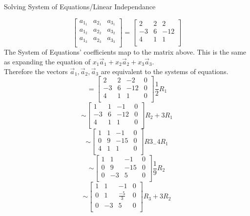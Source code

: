 \documentclass[12pt]{article}
\newcommand{\sqbrl}{\left[}
\newcommand{\sqbrr}{\right]}
\newenvironment{problem}[2][Problem]{\begin{trivlist}
\item[\hskip \labelsep {\bfseries #1}\hskip \labelsep {\bfseries #2.}]}{\end{trivlist}}
\begin{document}
\begin{problem}{5}
	Solving System of Equations/Linear Independance
\end{problem}
	\[\sqbrl\begin{matrix}
		a_{1_1} & a_{2_1} & a_{3_1}\\
		a_{1_2} & a_{2_2} & a_{3_2}\\
		a_{1_3} & a_{2_3} & a_{3_3}\\
	\end{matrix}\sqbrr
	= \sqbrl\begin{matrix}
		2 & 2 & 2\\
		-3 & 6 & -12\\
		4 & 1 & 1\\
		\end{matrix}\sqbrr		
	\]
The System of Equations' coefficients map to the matrix above. This is the same as expanding the equation of 
$x_1 \vec{a}_1 + x_2 \vec{a}_2 + x_3 \vec{a}_3$.\\
Therefore the vectors $\vec a_1,  \vec a_2,  \vec a_3$ are equivalent to the systems of equations.\\
	\[=
		\left[
		\begin{array}{ccc|c}
		2 & 2 & -2 & 0\\
		-3 & 6 & -12 & 0\\
		4 & 1 & 1 & 0\\
		\end{array}
		\right] \frac{1}{2} R_1
	\]
	\[\sim
		\left[
		\begin{array}{ccc|c}
		1 & 1 & -1 & 0\\
		-3 & 6 & -12 & 0\\
		4 & 1 & 1 & 0\\
		\end{array}
		\right] R_2 + 3R_1
	\]
	\[\sim
		\left[
		\begin{array}{ccc|c}
		1 & 1 & -1 & 0\\
		0 & 9 & -15 & 0\\
		4 & 1 & 1 & 0\\
		\end{array}
		\right] R3_ - 4R_1
	\]
	\[\sim
		\left[
		\begin{array}{ccc|c}
		1 & 1 & -1 & 0\\
		0 & 9 & -15 & 0\\
		0 & -3 & 5 & 0\\
		\end{array}
		\right] \frac{1}{9} R_2
	\]
	\[\sim
		\left[
		\begin{array}{ccc|c}
		1 & 1 & -1 & 0\\
		0 & 1 & \frac{-5}{3} & 0\\
		0 & -3 & 5 & 0\\
		\end{array}
		\right] R_3 + 3R_2
	\]
\end{document}
